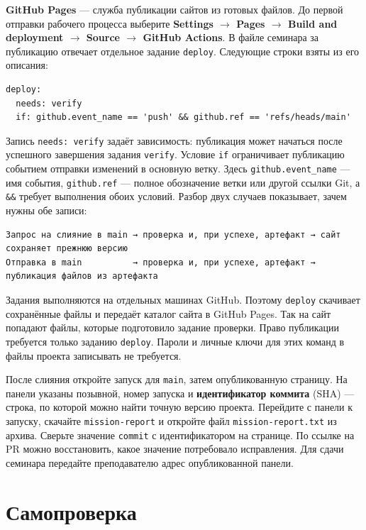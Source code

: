 \textbf{GitHub Pages} — служба публикации сайтов из готовых файлов. До первой отправки рабочего процесса выберите \textbf{Settings \(\to\) Pages \(\to\) Build and deployment \(\to\) Source \(\to\) GitHub Actions}. В файле семинара за публикацию отвечает отдельное задание \texttt{deploy}. Следующие строки взяты из его описания:

\begin{verbatim}
deploy:
  needs: verify
  if: github.event_name == 'push' && github.ref == 'refs/heads/main'
\end{verbatim}

Запись \texttt{needs: verify} задаёт зависимость: публикация может начаться после успешного завершения задания \texttt{verify}. Условие \texttt{if} ограничивает публикацию событием отправки изменений в основную ветку. Здесь \texttt{github.event\_name} — имя события, \texttt{github.ref} — полное обозначение ветки или другой ссылки Git, а \texttt{\&\&} требует выполнения обоих условий. Разбор двух случаев показывает, зачем нужны обе записи:

\begin{verbatim}
Запрос на слияние в main → проверка и, при успехе, артефакт → сайт сохраняет прежнюю версию
Отправка в main          → проверка и, при успехе, артефакт → публикация файлов из артефакта
\end{verbatim}

Задания выполняются на отдельных машинах GitHub. Поэтому \texttt{deploy} скачивает сохранённые файлы и передаёт каталог сайта в GitHub Pages. Так на сайт попадают файлы, которые подготовило задание проверки. Право публикации требуется только заданию \texttt{deploy}. Пароли и личные ключи для этих команд в файлы проекта записывать не требуется.

После слияния откройте запуск для \texttt{main}, затем опубликованную страницу. На панели указаны позывной, номер запуска и \textbf{идентификатор коммита} (SHA) — строка, по которой можно найти точную версию проекта. Перейдите с панели к запуску, скачайте \texttt{mission-report} и откройте файл \texttt{mission-report.txt} из архива. Сверьте значение \texttt{commit} с идентификатором на странице. По ссылке на PR можно восстановить, какое значение потребовало исправления. Для сдачи семинара передайте преподавателю адрес опубликованной панели.

\section{Самопроверка}


